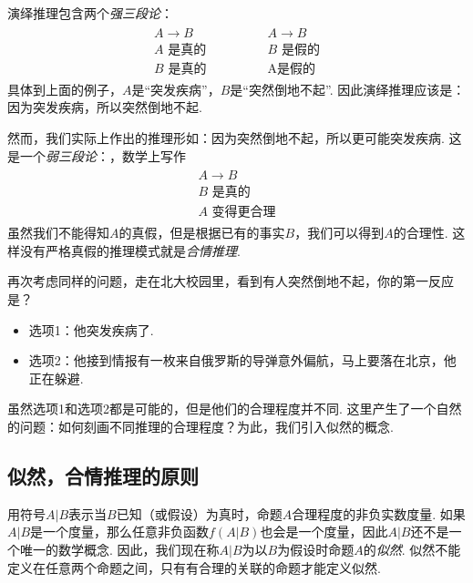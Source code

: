 演绎推理包含两个\emph{强三段论}：
    \[
        \begin{array}{c}
            \begin{array}{c}  
                A \to B \\ A\text{ 是真的} \\ \hline B\text{ 是真的}
            \end{array} 
            \qquad \qquad 
            \begin{array}{c}  
                A \to B \\ B\text{ 是假的} \\ \hline \text{A是假的}
            \end{array}
        \end{array} 
    \]
具体到上面的例子，$A$是``突发疾病''，$B$是``突然倒地不起''. 因此演绎推理应该是：因为突发疾病，所以突然倒地不起.

然而，我们实际上作出的推理形如：因为突然倒地不起，所以更可能突发疾病. 这是一个\emph{弱三段论}：，数学上写作 
        \[
        \begin{array}{c}
            \begin{array}{c}  
                A \to B \\ B\text{ 是真的} \\ \hline A\text{ 变得更合理}
            \end{array} 
        \end{array} 
    \]
虽然我们不能得知$A$的真假，但是根据已有的事实$B$，我们可以得到$A$的合理性. 这样没有严格真假的推理模式就是\emph{合情推理}.


再次考虑同样的问题，走在北大校园里，看到有人突然倒地不起，你的第一反应是？
    \begin{itemize}
        \item 选项1：他突发疾病了.
        \item 选项2：他接到情报有一枚来自俄罗斯的导弹意外偏航，马上要落在北京，他正在躲避.
    \end{itemize}
虽然选项1和选项2都是可能的，但是他们的合理程度并不同. 这里产生了一个自然的问题：如何刻画不同推理的合理程度？为此，我们引入似然的概念. 


\subsection{似然，合情推理的原则}

用符号$A|B$表示当$B$已知（或假设）为真时，命题$A$合理程度的非负实数度量. 如果$A|B$是一个度量，那么任意非负函数$f(A|B)$也会是一个度量，因此$A|B$还不是一个唯一的数学概念. 因此，我们现在称$A|B$为以$B$为假设时命题$A$的\emph{似然}. 似然不能定义在任意两个命题之间，只有有合理的关联的命题才能定义似然.

